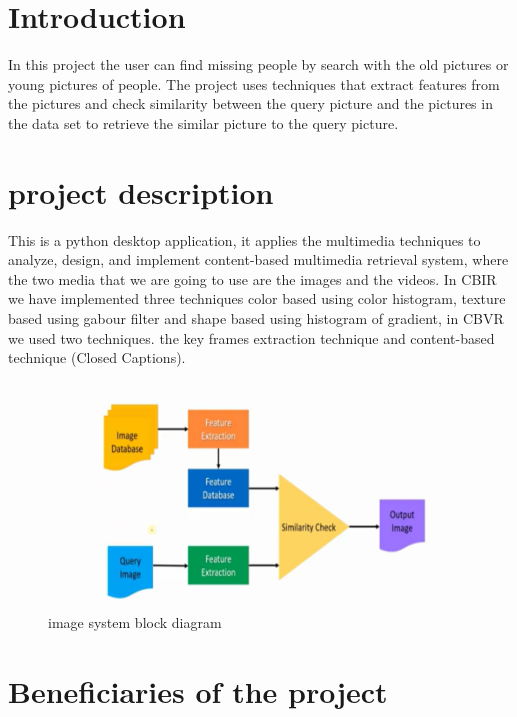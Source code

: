 \documentclass[pdftex,10pt,a4paper,oneside]{article}
\begin{document}
	\pagebreak
	
	\tableofcontents
	\pagebreak
	\listoffigures
	\pagebreak
	\listoftables
	\pagebreak
	\begin{abstract}{
			This paper presents imp DIP project
	}	\end{abstract}
	\pagebreak
	\section*{Introduction}
In this project the user can find missing people by search with the old pictures or young pictures of people. The project uses techniques that extract features from the pictures and check similarity between the query picture and the pictures in the data set to retrieve the similar picture to the query picture.
	 
	
	
	\pagebreak
	
	\section{project description}
	This is a python desktop application, it applies the multimedia techniques to analyze, design, and implement content-based multimedia retrieval system, where the two media that we are going to use are the images and the videos. In CBIR we have implemented three techniques color based using color histogram, texture based using gabour filter and shape based using histogram of gradient, in CBVR we used two techniques. the key frames extraction technique and content-based technique (Closed Captions).
	\begin{figure}[H]
		\centering
		\includegraphics[width=120mm,height=60mm]{fig/19.png}
		\caption{image system block diagram }
		\label{image system block diagram}
	\end{figure}

	\pagebreak
	\section{Beneficiaries of the project}
\end{document}
